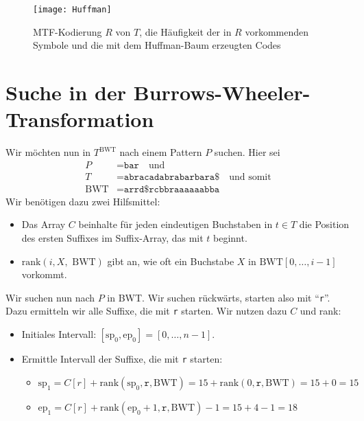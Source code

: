 \begin{figure}[H]
  \texttt{[image: Huffman]}
  \captionsetup{width=.5\textwidth}
  \caption{MTF-Kodierung \( R \) von \( T \), die Häufigkeit der in \( R \) vorkommenden Symbole und die mit dem Huffman-Baum erzeugten Codes}
\end{figure}

\section{Suche in der Burrows-Wheeler-Transformation}

Wir möchten nun in \( T^{\text{BWT}} \) nach einem Pattern \( P \) suchen. Hier sei
\begin{align*}
  P &= \texttt{bar} \quad \text{und} \\
  T &= \texttt{abracadabrabarbara\$}\quad\text{und somit} \\
  \text{BWT} &= \texttt{arrd\$rcbbraaaaaabba}
\end{align*}
Wir benötigen dazu zwei Hilfsmittel:

\begin{itemize}
  \item Das Array \( C \) beinhalte für jeden eindeutigen Buchstaben in \( t \in T \) die Position des ersten Suffixes im Suffix-Array, das mit \( t \) beginnt.
  \item \( \text{rank}(i,X,\text{ BWT}) \) gibt an, wie oft ein Buchstabe \( X \) in \( \text{BWT}[0,\dots,i-1] \) vorkommt.
\end{itemize}

Wir suchen nun nach \( P \) in BWT. Wir suchen rückwärts, starten also mit ``\texttt{r}''. Dazu ermitteln wir alle Suffixe, die mit \texttt{r} starten. Wir nutzen dazu \( C \) und rank:

\begin{itemize}
  \item Initiales Intervall: \( [\text{sp}_0, \text{ep}_0] = [0,\dots,n-1] \).
  \item Ermittle Intervall der Suffixe, die mit \texttt{r} starten:
  \begin{itemize}
    \item \( \text{sp}_1 = C[r] + \text{rank}(\text{sp}_0, \texttt{r}, \text{BWT}) = 15 + \text{rank}(0,\texttt{r}, \text{BWT}) = 15+0 = 15 \)
    \item \( \text{ep}_1 = C[r] + \text{rank}(\text{ep}_0 + 1, \texttt{r}, \text{BWT}) - 1 = 15 + 4 - 1 = 18 \)
  \end{itemize}
\end{itemize}

